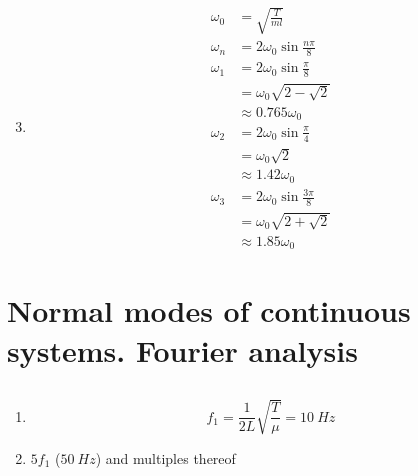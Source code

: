 \documentclass{article}
\begin{document}
\begin{enumerate}
  \setcounter{enumi}{2}
  \item

        \begin{align*}
          \omega_0 & = \sqrt{\frac{T}{m l}}            \\
          \omega_n & = 2 \omega_0 \sin \frac{n \pi}{8} \\
          \omega_1 & = 2 \omega_0 \sin \frac{\pi}{8}   \\
                   & = \omega_0 \sqrt{2 - \sqrt{2}}    \\
                   & \approx 0.765 \omega_0            \\
          \omega_2 & = 2 \omega_0 \sin \frac{\pi}{4}   \\
                   & = \omega_0 \sqrt{2}               \\
                   & \approx 1.42 \omega_0             \\
          \omega_3 & = 2 \omega_0 \sin \frac{3 \pi}{8} \\
                   & = \omega_0 \sqrt{2 + \sqrt{2}}    \\
                   & \approx 1.85 \omega_0
        \end{align*}
\end{enumerate}

\section{Normal modes of continuous systems. Fourier analysis}

\subsection{}

\begin{enumerate}
  \item \[f_1 = \frac{1}{2 L} \sqrt{\frac{T}{\mu}} = \qty{10}{Hz}\]

  \item $5 f_1$ ($\qty{50}{Hz}$) and multiples thereof
\end{enumerate}

\subsection{}
\end{document}
